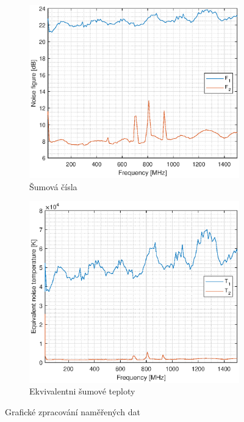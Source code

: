 \documentclass[11pt,a4paper]{article}
\begin{document}
\begin{figure}[!ht]
\centering
\begin{subfigure}{.45\textwidth}
    \centering
    \includegraphics[width=\textwidth]{src/task1-figures.eps}
    \caption{Šumová čísla}
    \label{fig:task1-figures}
\end{subfigure}
\begin{subfigure}{.45\textwidth}
    \centering
    \includegraphics[width=\textwidth]{src/task1-temperatures.eps}
    \caption{Ekvivalentni šumové teploty}
    \label{fig:task1-temperatures}
\end{subfigure}
\caption{Grafické zpracování naměřených dat}
\end{figure}
\end{document}

